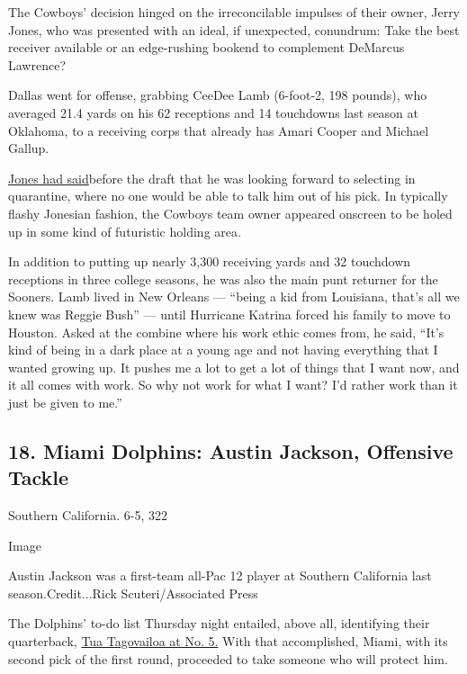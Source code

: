 The Cowboys' decision hinged on the irreconcilable impulses of their
owner, Jerry Jones, who was presented with an ideal, if unexpected,
conundrum: Take the best receiver available or an edge-rushing bookend
to complement DeMarcus Lawrence?

Dallas went for offense, grabbing CeeDee Lamb (6-foot-2, 198 pounds),
who averaged 21.4 yards on his 62 receptions and 14 touchdowns last
season at Oklahoma, to a receiving corps that already has Amari Cooper
and Michael Gallup.

\href{https://profootballtalk.nbcsports.com/2020/04/23/jerry-jones-will-draft-at-home-alone-with-no-one-to-stop-him/}{Jones
had said}before the draft that he was looking forward to selecting in
quarantine, where no one would be able to talk him out of his pick. In
typically flashy Jonesian fashion, the Cowboys team owner appeared
onscreen to be holed up in some kind of futuristic holding area.

In addition to putting up nearly 3,300 receiving yards and 32 touchdown
receptions in three college seasons, he was also the main punt returner
for the Sooners. Lamb lived in New Orleans --- ``being a kid from
Louisiana, that's all we knew was Reggie Bush'' --- until Hurricane
Katrina forced his family to move to Houston. Asked at the combine where
his work ethic comes from, he said, ``It's kind of being in a dark place
at a young age and not having everything that I wanted growing up. It
pushes me a lot to get a lot of things that I want now, and it all comes
with work. So why not work for what I want? I'd rather work than it just
be given to me.''

\hypertarget{18-miami-dolphins-austin-jackson-offensive-tackle}{%
\subsection{18. Miami Dolphins: Austin Jackson, Offensive
Tackle}\label{18-miami-dolphins-austin-jackson-offensive-tackle}}

Southern California. 6-5, 322

Image

Austin Jackson was a first-team all-Pac 12 player at Southern California
last season.Credit...Rick Scuteri/Associated Press

The Dolphins' to-do list Thursday night entailed, above all, identifying
their quarterback,
\href{https://www.nytimes3xbfgragh.onion/article/tua-tagovailoa.html}{Tua
Tagovailoa at No. 5.} With that accomplished, Miami, with its second
pick of the first round, proceeded to take someone who will protect him.

